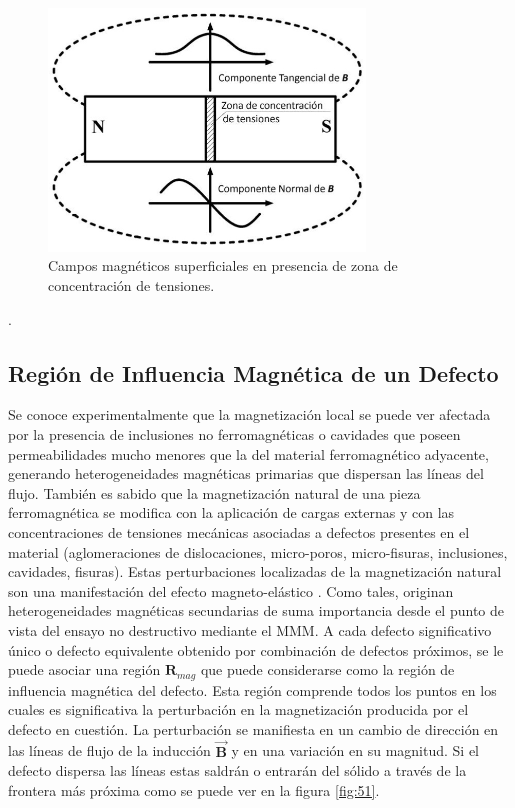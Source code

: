 \begin{figure}[h]
	\centering
	\includegraphics[width=0.75\textwidth]{./Figures/fig50}
	\caption{Campos magnéticos superficiales en presencia de zona de concentración de tensiones.}
	\label{fig:50}
\end{figure}. 


\subsection{Región de Influencia Magnética de un Defecto}

Se conoce experimentalmente \citep{Lauer:1} que la magnetización local se puede ver afectada por la presencia de inclusiones no ferromagnéticas o cavidades que poseen permeabilidades mucho menores que la del material ferromagnético adyacente, generando heterogeneidades magnéticas primarias que dispersan las líneas del flujo. También es sabido \citep{Lauer:1} que la magnetización natural de una pieza ferromagnética se modifica con la aplicación de cargas externas y con las concentraciones de tensiones mecánicas asociadas a defectos presentes en el material (aglomeraciones de dislocaciones, micro-poros, micro-fisuras, inclusiones, cavidades, fisuras). Estas perturbaciones localizadas de la magnetización natural son una manifestación del efecto magneto-elástico \citep{MagnetoElastic}. Como tales, originan heterogeneidades magnéticas secundarias de suma importancia desde el punto de vista del ensayo no destructivo mediante el MMM. A cada defecto significativo único o defecto equivalente obtenido por combinación de defectos próximos, se le puede asociar una región $\mathit{\mathbf{R}}_{mag}$ que puede considerarse como la región de influencia magnética del defecto. Esta región comprende todos los puntos en los cuales es significativa la perturbación en la magnetización producida por el defecto en cuestión. La perturbación se manifiesta en un cambio de dirección en las líneas de flujo de la inducción $\vec{\mathit{\mathbf{B}}}$ y en una variación en su magnitud. Si el defecto dispersa las
líneas estas saldrán o entrarán del sólido a través de la frontera más próxima como se puede ver en la figura \ref{fig:51}.

